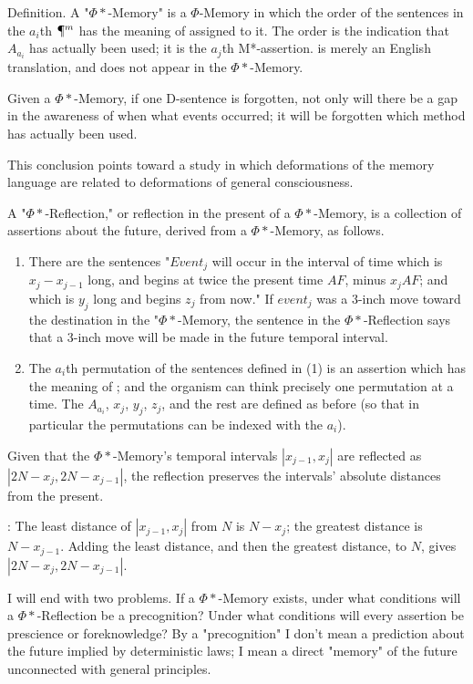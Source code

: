 \documentclass[10pt,twoside]{memoir}
\begin{document}
\begin{enumerate}
{\begin{enumerate}
\begin{sysrules}
\begin{sysrules}
\begin{sysrules}
\begin{sysrules}
{\begin{enumerate}
Definition. A "$\Phi*$-Memory" is a $\Phi$-Memory in which the order of the 
sentences in the $a_i$th $\mathparagraph^m$ has the meaning of 
assigned to it. The order is the indication that $A_{a_i}$ has actually been used; it 
is the $a_j$th M*-assertion.  is merely an English 
translation, and does not appear in the $\Phi*$-Memory. 

 Given a $\Phi*$-Memory, if one D-sentence is forgotten, not 
only will there be a gap in the awareness of when what events occurred; it 
will be forgotten which method has actually been used. 

This conclusion points toward a study in which deformations of the 
memory language are related to deformations of general consciousness. 

 A "$\Phi*$-Reflection," or reflection in the present of a 
$\Phi*$-Memory, is a collection of assertions about the future, derived from a 
$\Phi*$-Memory, as follows. 
\begin{enumerate}
	\item There are the sentences "$Event_j$ will occur in the 
interval of time which is $x_j-x_{j-1}$ long, and begins at twice the present time 
$AF$, minus $x_j AF$; and which is $y_j$ long and begins $z_j$ from now." If $event_j$ was 
a 3-inch move toward the destination in the "$\Phi*$-Memory, the sentence in the 
$\Phi*$-Reflection says that a 3-inch move will be made in the future temporal 
interval. 
	\item The $a_i$th permutation of the sentences defined in (1) is an 
assertion which has the meaning of ; and the organism can 
think precisely one permutation at a time. The $A_{a_i}$, $x_j$, $y_j$, $z_j$, and the rest are 
defined as before (so that in particular the permutations can be indexed with 
the $a_i$). 
\end{enumerate}

 Given that the $\Phi*$-Memory's temporal intervals $|x_{j-1}, x_j|$
are reflected as $|2N-x_j, 2N-x_{j-1}|$, the reflection preserves the intervals' 
absolute distances from the present. 

\proof: The least distance of $|x_{j-1}, x_j|$
from $N$ is $N-x_j$; the greatest distance is $N-x_{j-1}$. Adding the least distance, and 
then the greatest distance, to $N$, gives $|2N-x_j, 2N-x_{j-1}|$.

I will end with two problems. If a $\Phi*$-Memory exists, under what 
conditions will a $\Phi*$-Reflection be a precognition? Under what conditions 
will every assertion be prescience or foreknowledge? By a "precognition" I 
don't mean a prediction about the future implied by deterministic laws; I 
mean a direct "memory" of the future unconnected with general principles. 


\end{enumerate}}
\end{sysrules}
\end{sysrules}
\end{sysrules}
\end{sysrules}
\end{enumerate}}
\end{enumerate}
\end{document}
